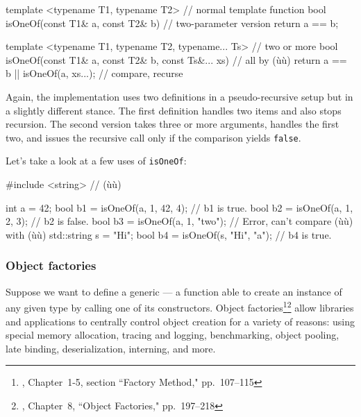 \begin{emcppslisting}[emcppsbatch=e34]
template <typename T1, typename T2>     // normal template function
bool isOneOf(const T1& a, const T2& b)  // two-parameter version
{
  return a == b;
}

template <typename T1, typename T2, typename... Ts>      // two or more
bool isOneOf(const T1& a, const T2& b, const Ts&... xs)  // all by (ù{}ù)
{
  return a == b || isOneOf(a, xs...);                    // compare, recurse
}
\end{emcppslisting}
    

\noindent Again, the implementation uses two definitions in a pseudo-recursive
setup but in a slightly different stance. The first definition handles
two items and also stops recursion. The second version takes three or
more arguments, handles the first two, and issues the recursive call
only if the comparison yields \lstinline!false!.

Let's take a look at a few uses of \lstinline!isOneOf!:

\begin{emcppslisting}[emcppsbatch=e34]
#include <string>  // (ù{}ù)

int a = 42;
bool b1 = isOneOf(a, 1, 42, 4);  // b1 is true.
bool b2 = isOneOf(a, 1, 2, 3);   // b2 is false.
bool b3 = isOneOf(a, 1, "two");  // Error, can't compare (ù{}ù) with (ù{}ù)
std::string s = "Hi";
bool b4 = isOneOf(s, "Hi", "a"); // b4 is true.
\end{emcppslisting}
    

\subsubsection[Object factories]{Object factories}\label{object-factories}

Suppose we want to define a generic  --- a
function able to create an instance of any given type by calling one of
its constructors. Object
factories{\cprotect\footnote{\cite{gamma95}, Chapter~1-5, section
``Factory Method," pp.~107--115}}{\cprotect\footnote{\cite{alexandrescu01},
  Chapter~8, ``Object Factories," pp.~197--218}} allow libraries and
applications to centrally control object creation for a variety of
reasons: using special memory allocation, tracing and logging,
benchmarking, object pooling, late binding, deserialization, interning,
and more.

